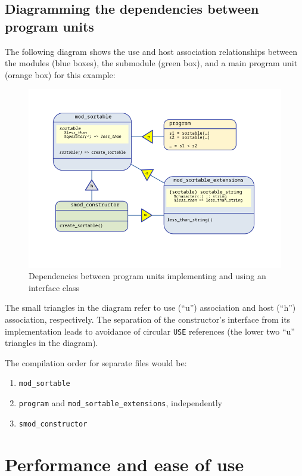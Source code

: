 \documentclass[
  paper=a4,
  ,captions=tableheading
]{scrartcl}
\providecommand{\tightlist}{%
  \setlength{\itemsep}{0pt}\setlength{\parskip}{0pt}}
\begin{document}
\subsection{Diagramming the dependencies between program
units}\label{diagramming-the-dependencies-between-program-units}

The following diagram shows the use and host association relationships
between the modules (blue boxes), the submodule (green box), and a main
program unit (orange box) for this example:

\begin{figure}
\centering
\includegraphics[width=12cm,height=\textheight,keepaspectratio]{Dependency_inversion.svg.png}
\caption{Dependencies between program units implementing and using an
interface class}
\end{figure}

The small triangles in the diagram refer to use (``u'') association and
host (``h'') association, respectively. The separation of the
constructor's interface from its implementation leads to avoidance of
circular \texttt{USE} references (the lower two ``u'' triangles in the
diagram).

The compilation order for separate files would be:

\begin{enumerate}
\def\labelenumi{\arabic{enumi}.}
\tightlist
\item
  \texttt{mod\_sortable}
\item
  \texttt{program} and \texttt{mod\_sortable\_extensions}, independently
\item
  \texttt{smod\_constructor}
\end{enumerate}

\section{Performance and ease of use}\label{performance-and-ease-of-use}
\end{document}
